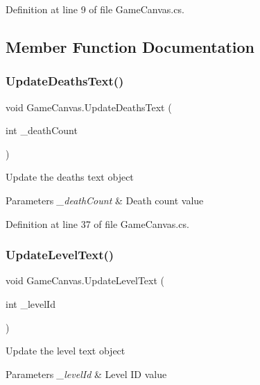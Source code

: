 Definition at line 9 of file Game\+Canvas.\+cs.



\subsection{Member Function Documentation}
\mbox{\label{class_game_canvas_a1216454a399f7fd8b77126860da80802}} 
\subsubsection{\texorpdfstring{Update\+Deaths\+Text()}{UpdateDeathsText()}}
{\footnotesize\ttfamily void Game\+Canvas.\+Update\+Deaths\+Text (\begin{DoxyParamCaption}\item[{int}]{\+\_\+death\+Count }\end{DoxyParamCaption})}



Update the deaths text object 


\begin{DoxyParams}{Parameters}
{\em \+\_\+death\+Count} & Death count value\\
\hline
\end{DoxyParams}


Definition at line 37 of file Game\+Canvas.\+cs.

\mbox{\label{class_game_canvas_a0fb4b8c30320c818ec44b62689242121}} 
\subsubsection{\texorpdfstring{Update\+Level\+Text()}{UpdateLevelText()}}
{\footnotesize\ttfamily void Game\+Canvas.\+Update\+Level\+Text (\begin{DoxyParamCaption}\item[{int}]{\+\_\+level\+Id }\end{DoxyParamCaption})}



Update the level text object 


\begin{DoxyParams}{Parameters}
{\em \+\_\+level\+Id} & Level ID value\\
\hline
\end{DoxyParams}


